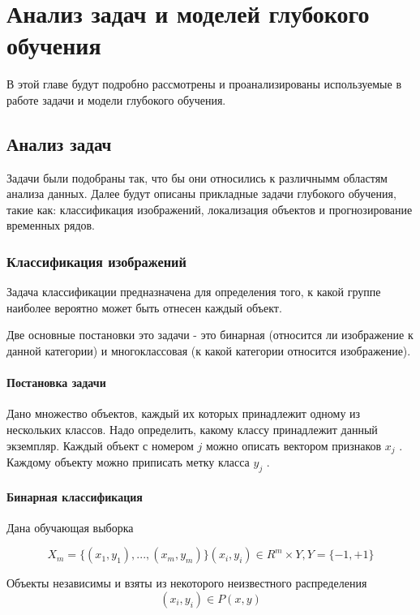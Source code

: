 \chapter{Анализ задач и моделей глубокого обучения}

В этой главе будут подробно рассмотрены и проанализированы используемые в работе задачи и модели глубокого обучения.

\section{Анализ задач}

Задачи были подобраны так, что бы они относились к различнымм областям анализа данных. 
Далее будут описаны прикладные задачи глубокого обучения, такие как: классификация изображений, локализация объектов и прогнозирование временных рядов.


\subsection{Классификация изображений}

Задача классификации предназначена для определения того, к какой группе наиболее вероятно может быть отнесен каждый объект. 

Две основные постановки это задачи - это бинарная (относится ли изображение к данной категории) и многоклассовая (к какой категории относится изображение).

\subsubsection{Постановка задачи}

Дано множество объектов, каждый их которых принадлежит одному из нескольких классов. Надо определить, какому классу принадлежит данный экземпляр.
Каждый объект с номером $j$ можно описать вектором признаков $x_j$ .
Каждому объекту можно приписать метку класса $y_j$ .


\subsubsection{Бинарная классификация}

Дана обучающая выборка 

$$ X_m=\lbrace(x_1,y_1),...,(x_m,y_m)\rbrace (x_i,y_i)\in R^m \times Y , Y=\lbrace -1 , +1 \rbrace$$

Объекты независимы и взяты из некоторого неизвестного распределения 
$$ (x_i,y_i) \in P(x,y)$$

